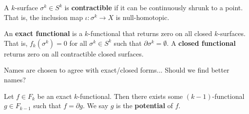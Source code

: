 \documentclass[11pt,letterpaper,fleqn]{memoir}
\begin{document}
\begin{defn}
	A $k$-surface $\sigma^k \in S^k$ is \textbf{contractible} if it can be continuously shrunk to a point. That is, the inclusion map $\iota : \sigma^k \to X$ is null-homotopic.
\end{defn}

\begin{defn}
	An \textbf{exact functional} is a $k$-functional that returns zero on all closed $k$-surfaces. That is, $f_k(\sigma^k) = 0$ for all $\sigma^k \in S^k$ such that $\partial\sigma^k = \emptyset$. A \textbf{closed functional} returns zero on all contractible closed surfaces.
\end{defn}

\begin{remark}
	Names are chosen to agree with exact/closed forms... Should we find better names?
\end{remark}

\begin{prop}
	Let $f \in F_k$ be an exact $k$-functional. Then there exists some $(k-1)$-functional $g \in F_{k-1}$ such that $f = \partial g$. We say $g$ is the \textbf{potential} of $f$.
\end{prop}
\end{document}
